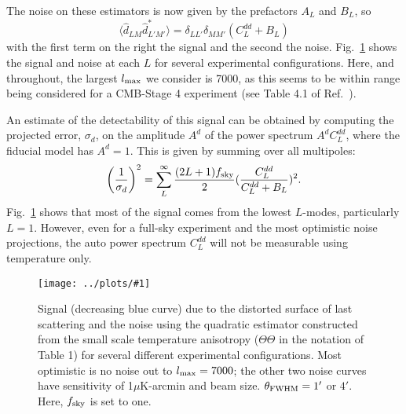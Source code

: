 \documentclass[prl,amsmath,amssymb,floatfix,superscriptaddress,nofootinbib,twocolumn]{revtex4-1}
\def\be{\begin{equation}}
\def\ee{\end{equation}}
\newcommand{\eql}[1]{\label{eq:#1}}
\newcommand{\sfig}[2]{
\texttt{[image: ../plots/\#1]}
        }
\newcommand{\Sfig}[2]{
   \begin{figure}[thbp]
   \begin{center}
    \sfig{#1.pdf}{\columnwidth}
    \caption{{\small #2}}
    \label{fig:#1}
     \end{center}
   \end{figure}
}
\newcommand{\rf}[1]{\ref{fig:#1}}
\newcommand{\scott}[1]{{\color{darkgreen} #1}}
\newcommand{\wh}[1]{{\color{red} #1}}
\begin{document}
The noise on these estimators is now given by the prefactors $A_L$ and $B_L$, so  
\be
\langle \hat d_{LM} \hat d^*_{L'M'}  \rangle = \delta_{LL'}\delta_{MM'} \left( C_L^{dd} + B_L \right)
\ee
with the first term on the right the signal and the second the noise. Fig.~\rf{Delay} shows the signal and noise at each $ L$ for several experimental configurations. Here, and throughout, the largest $l_{\rm max}$ we consider is 7000, as this seems to be within range being considered for a CMB-Stage 4 experiment (see Table 4.1 of Ref.~\cite{Abazajian:2016yjj}).

An estimate of the detectability of this signal can be obtained by computing the projected error, $\sigma_d$, on the amplitude $A^d$ of the power spectrum $A^dC_L^{dd}$, where the fiducial model has $A^d=1$. This is given by summing over all multipoles:
\be
\left(\frac{1}{\sigma_d}\right)^2 = \sum_L^{\infty} \frac{(2L+1)f_{\rm sky}}{2} (\frac{C_L^{dd}}{C_L^{dd}+B_L})^2\eql{sn}
.\ee
Fig.~\rf{Delay} shows that most of the signal comes from the lowest $L$-modes, particularly $L=1$. However, even for a full-sky experiment and the most optimistic noise projections, the
\wh{auto power spectrum $C_L^{dd}$ will not be measurable using temperature only.}%

\Sfig{Delay}{Signal (decreasing blue curve) due to the distorted surface of last scattering and the noise using the quadratic estimator constructed from the small scale temperature anisotropy ($\Theta\Theta$ in the notation of Table 1) for several different experimental configurations. Most optimistic is no noise out to $l_{\rm max}=7000$; the other two noise curves have sensitivity of 1$\mu$K-arcmin and beam size. %
$\theta_{\rm FWHM}=1'$ or $4'$. Here, $f_{\rm sky}$ is set to one.} %
\end{document}
